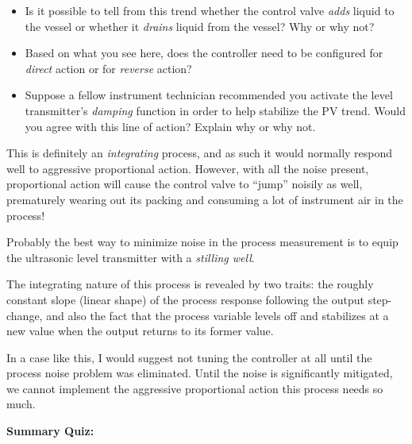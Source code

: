 \begin{itemize}
\item{} Is it possible to tell from this trend whether the control valve {\it adds} liquid to the vessel or whether it {\it drains} liquid from the vessel?  Why or why not? 
\item{} Based on what you see here, does the controller need to be configured for {\it direct} action or for {\it reverse} action?
\item{} Suppose a fellow instrument technician recommended you activate the level transmitter's {\it damping} function in order to help stabilize the PV trend.  Would you agree with this line of action?  Explain why or why not.
\end{itemize}







This is definitely an {\it integrating} process, and as such it would normally respond well to aggressive proportional action.  However, with all the noise present, proportional action will cause the control valve to ``jump'' noisily as well, prematurely wearing out its packing and consuming a lot of instrument air in the process!

Probably the best way to minimize noise in the process measurement is to equip the ultrasonic level transmitter with a {\it stilling well}.







The integrating nature of this process is revealed by two traits: the roughly constant slope (linear shape) of the process response following the output step-change, and also the fact that the process variable levels off and stabilizes at a new value when the output returns to its former value.

In a case like this, I would suggest not tuning the controller at all until the process noise problem was eliminated.  Until the noise is significantly mitigated, we cannot implement the aggressive proportional action this process needs so much.






\vfil \eject

\noindent
{\bf Summary Quiz:}

